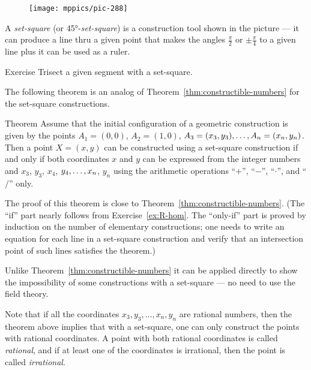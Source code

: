 {

\begin{wrapfigure}[5]{r}{26mm}
\vskip-12mm
\centering
\texttt{[image: mppics/pic-288]}
\end{wrapfigure}

A \emph{set-square} (or 45°-\emph{set-square}) is a construction tool shown in the picture ---
it can produce a line thru a given point
that makes the angles
$\tfrac\pi2$ or $\pm\tfrac\pi4$ 
to a given line plus it can be used as a ruler.

}

\begin{thm}{Exercise}\label{ex:trisect-set-square}
Trisect a given segment with a set-square.
\end{thm}

The following theorem is an analog of Theorem~\ref{thm:constructible-numbers} for the set-square constructions.

\begin{thm}{Theorem}\label{thm:set-square-constructible-numbers}
Assume that the initial configuration of a geometric construction is given by the points $A_1=(0,0)$, $A_2=(1,0)$, $A_3\z=(x_3,y_3),\z\dots,A_n=(x_n,y_n)$.
Then a point $X=(x,y)$ can be constructed using a set-square construction
if and only if both coordinates $x$ and $y$ can be expressed from the integer numbers and $x_3$, $y_3$, $x_4$, $y_4,\z\dots,x_n$, $y_n$ using the arithmetic operations ``$+$'', ``$-$'', ``$\cdot$'', and ``$/$'' only. 
\end{thm}

The proof of this theorem is close to Theorem~\ref{thm:constructible-numbers}.
(The ``if'' part nearly follows from Exercise~\ref{ex:R-hom}.
The ``only-if'' part is proved by induction on the number of elementary constructions; one needs to write an equation for each line in a set-square construction and verify that an intersection point of such lines satisfies the theorem.)

Unlike Theorem~\ref{thm:constructible-numbers} it can be applied directly to show the impossibility of some constructions with a set-square --- no need to use the field theory.

Note that if all the coordinates $x_3,y_3,\dots,x_n,y_n$ are rational numbers, then the theorem above implies that with a set-square, one can only construct the points with rational coordinates.
A point with both rational coordinates is called \emph{rational},
and if at least one of the coordinates is irrational, then the point is called \emph{irrational}.


